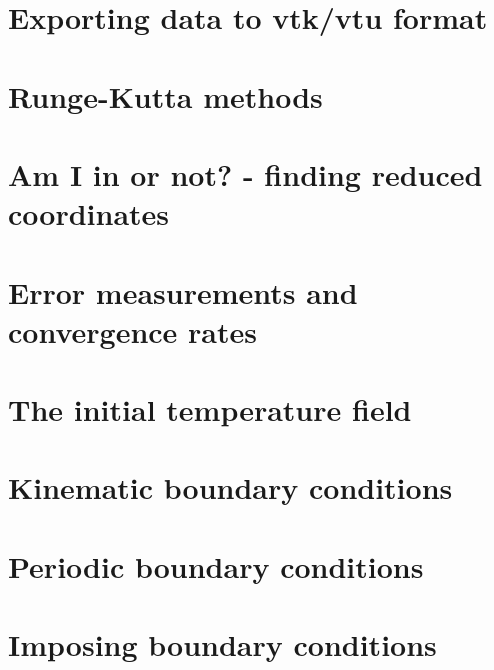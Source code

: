 \section{Exporting data to vtk/vtu format}  %
\newpage %
\section{Runge-Kutta methods}\label{ss:rkm}  %
\newpage %
\section{Am I in or not? - finding reduced coordinates}\label{sec:amiin} %
\newpage %
\section{Error measurements and convergence rates}  %
\newpage %
\section{The initial temperature field}  %
\newpage %
\section{Kinematic boundary conditions}\label{kin_bc}  %
\newpage %
\section{Periodic boundary conditions\label{ss_periodic}} %
\newpage %
\section{Imposing boundary conditions \label{ss:howtobc}}  %
\newpage %
